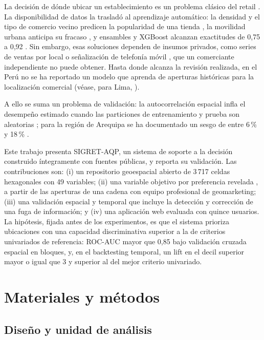 \documentclass[10pt,letterpaper,twocolumn]{article}
\begin{document}
La decisión de dónde ubicar un establecimiento es un problema clásico del retail \citep{huff1964}. La disponibilidad de datos la trasladó al aprendizaje automático: la densidad y el tipo de comercio vecino predicen la popularidad de una tienda \citep{karamshuk2013}, la movilidad urbana anticipa su fracaso \citep{dsilva2018}, y ensambles y XGBoost alcanzan exactitudes de 0,75 a 0,92 \citep{lu2024,zhao2025,ou2026}. Sin embargo, esas soluciones dependen de insumos privados, como series de ventas por local \citep{lu2024,hu2025} o señalización de telefonía móvil \citep{zou2024}, que un comerciante independiente no puede obtener. Hasta donde alcanza la revisión realizada, en el Perú no se ha reportado un modelo que aprenda de aperturas históricas para la localización comercial (véase, para Lima, \citealp{rossi2024}).

A ello se suma un problema de validación: la autocorrelación espacial infla el desempeño estimado cuando las particiones de entrenamiento y prueba son aleatorias \citep{ploton2020,roberts2017,meyer2021}; para la región de Arequipa se ha documentado un sesgo de entre 6\,\% y 18\,\% \citep{kumar2025}.

Este trabajo presenta SIGRET-AQP, un sistema de soporte a la decisión construido íntegramente con fuentes públicas, y reporta su validación. Las contribuciones son: (i) un repositorio geoespacial abierto de 3\,717 celdas hexagonales con 49 variables; (ii) una variable objetivo por preferencia revelada \citep{samuelson1938}, a partir de las aperturas de una cadena con equipo profesional de geomarketing; (iii) una validación espacial y temporal que incluye la detección y corrección de una fuga de información; y (iv) una aplicación web evaluada con quince usuarios. La hipótesis, fijada antes de los experimentos, es que el sistema prioriza ubicaciones con una capacidad discriminativa superior a la de criterios univariados de referencia: ROC-AUC mayor que 0,85 bajo validación cruzada espacial en bloques, y, en el backtesting temporal, un lift en el decil superior mayor o igual que 3 y superior al del mejor criterio univariado.

\section{Materiales y métodos}

\subsection{Diseño y unidad de análisis}
\end{document}

